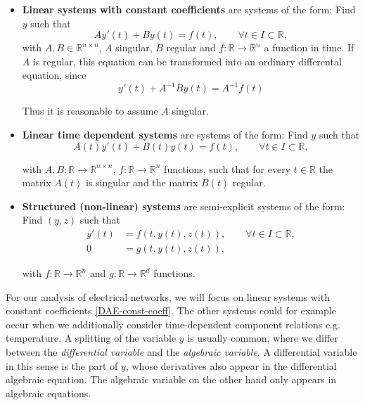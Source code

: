 	\begin{itemize}
		\item \textbf{Linear systems with constant coefficients} \newline
		are systems of the form: Find $y$ such that
		\begin{equation}
			\label{DAE-const-coeff}
			A y'(t) + B y(t) = f(t), \qquad \forall t \in I \subset \mathbb{R},
		\end{equation}
		with $A,B \in \mathbb{R}^{n \times n}$, $A$ singular, $B$ regular and $f:\mathbb{R} \to \mathbb{R}^n$ a function in time. If $A$ is regular, this equation can be transformed into an ordinary differental equation, since
		\begin{displaymath}
			y'(t) + A^{-1}By(t) = A^{-1} f(t)
		\end{displaymath}
		
		Thus it is reasonable to assume $A$ singular.
		
		\item \textbf{Linear time dependent systems}
		are systems of the form: Find $y$ such that
		\begin{displaymath}
			A(t) y'(t) + B(t) y(t) = f(t) , \qquad \forall t \in I \subset \mathbb{R},
		\end{displaymath}
	
		with $A, B:\mathbb{R} \to \mathbb{R}^{n \times n}$, $f:\mathbb{R} \to \mathbb{R}^n$ functions, such that for every $t \in \mathbb{R}$ the matrix $A(t)$ is singular and the matrix $B(t)$ regular.
		
		\item  \textbf{Structured (non-linear) systems} \newline
		are semi-explicit systems of the form: Find $(y,z)$ such that
		\begin{align*}
			y'(t) &= f(t, y(t), z(t)) , \qquad \forall t \in I \subset \mathbb{R}, \\
			0 &= g(t,y(t),z(t)) ,
		\end{align*}
	
		with $f:\mathbb{R} \to \mathbb{R}^n$ and $g:\mathbb{R} \to \mathbb{R}^d$ functions.
	\end{itemize}

	For our analysis of electrical networks, we will focus on linear systems with constant coefficients \eqref{DAE-const-coeff}. The other systems could for example occur when we additionally consider time-dependent component relations e.g. temperature. 
	A splitting of the variable $y$ is usually common, where we differ between the \emph{differential variable} and the \emph{algebraic variable}. A differential variable in this sense is the part of $y$, whose derivatives also appear in the differential algebraic equation. The algebraic variable on the other hand only appears in algebraic equations.


